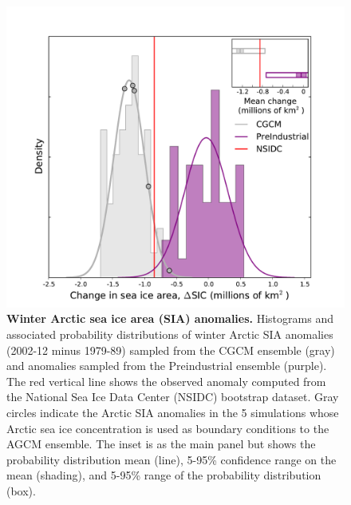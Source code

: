 \documentclass{nature}
\begin{document}
\begin{figure}%
\centering
\noindent\includegraphics[width=39pc]{Word/SuppFig_1.pdf}
\caption{\textbf{Winter Arctic sea ice area (SIA) anomalies.} Histograms and associated probability distributions of winter Arctic SIA anomalies (2002-12 minus 1979-89) sampled from the CGCM ensemble (gray) and anomalies sampled from the Preindustrial ensemble (purple). The red vertical line shows the observed anomaly computed from the National Sea Ice Data Center (NSIDC) bootstrap dataset. Gray circles indicate the Arctic SIA anomalies in the 5 simulations whose Arctic sea ice concentration is used as boundary conditions to the AGCM ensemble. The inset is as the main panel but shows the probability distribution mean (line), 5-95\% confidence range on the mean (shading), and 5-95\% range of the probability distribution (box).
} 
\label{fig:supfig1} 
\end{figure}


\newpage

%

\end{document}
